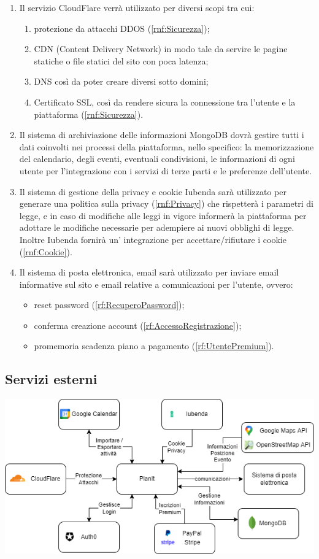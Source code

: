 \begin{enumerate}
    \item Il servizio CloudFlare verrà utilizzato per diversi scopi tra cui:
          \begin{enumerate}
              \item protezione da attacchi DDOS (\ref{rnf:Sicurezza});
              \item CDN (Content Delivery Network) in modo tale da servire le pagine statiche o file statici del sito con poca latenza;
              \item DNS così da poter creare diversi sotto domini;
              \item Certificato SSL, così da rendere sicura la connessione tra l'utente e la piattaforma (\ref{rnf:Sicurezza}).
          \end{enumerate}

    \item Il sistema di archiviazione delle informazioni MongoDB dovrà gestire tutti i dati coinvolti nei processi della piattaforma, nello specifico: la memorizzazione del calendario, degli eventi, eventuali condivisioni, le informazioni di ogni utente per l'integrazione con i servizi di terze parti e le preferenze dell'utente.

    \item Il sistema di gestione della privacy e cookie Iubenda sarà utilizzato per generare una politica sulla privacy (\ref{rnf:Privacy}) che rispetterà i parametri di legge, e in caso di modifiche alle leggi in vigore informerà la piattaforma per adottare le modifiche necessarie per adempiere ai nuovi obblighi di legge. Inoltre Iubenda fornirà un' integrazione per accettare/rifiutare i cookie (\ref{rnf:Cookie}).

    \item Il sistema di posta elettronica, email sarà utilizzato per inviare email informative sul sito e email relative a comunicazioni per l'utente, ovvero:
          \begin{itemize}
              \item reset password (\ref{rf:RecuperoPassword});
              \item conferma creazione account (\ref{rf:AccessoRegistrazione});
              \item promemoria scadenza piano a pagamento (\ref{rf:UtentePremium}).
          \end{itemize}
\end{enumerate}

\subsection*{Servizi esterni}
\begin{center}
    \includegraphics[width=1\textwidth]{img/Servizi/Servizi esterni.drawio.png}
\end{center}
